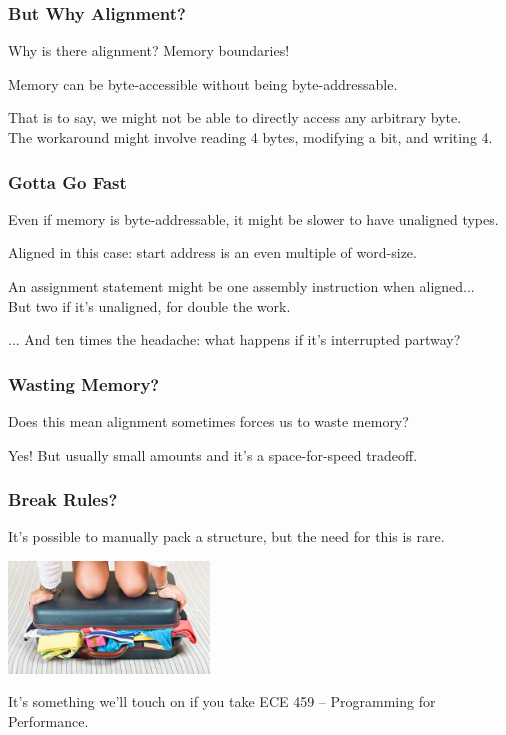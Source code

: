 \begin{frame}
\frametitle{But Why Alignment?}

Why is there alignment? Memory boundaries!

Memory can be byte-accessible without being \alert{byte-addressable}.

That is to say, we might not be able to directly access any arbitrary byte.\\
\quad The workaround might involve reading 4 bytes, modifying a bit, and writing 4.

\end{frame}

\begin{frame}
\frametitle{Gotta Go Fast}

Even if memory is byte-addressable, it might be slower to have unaligned types.

Aligned in this case: start address is an even multiple of word-size.

An assignment statement might be one assembly instruction when aligned...\\
\quad But two if it's unaligned, for double the work.

... And ten times the headache: what happens if it's interrupted partway?

\end{frame}

\begin{frame}
\frametitle{Wasting Memory?}

Does this mean alignment sometimes forces us to waste memory?

Yes! But usually small amounts and it's a space-for-speed tradeoff.

\end{frame}

\begin{frame}
\frametitle{Break Rules?}

It's possible to manually pack a structure, but the need for this is rare.

\begin{center}
  \includegraphics[width=0.4\textwidth]{images/overstuffed-suitcase.jpg}
\end{center}

It's something we'll touch on if you take ECE 459 -- Programming for Performance.

\end{frame}

